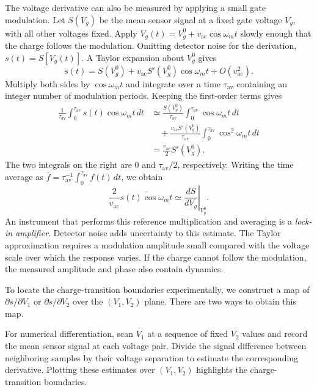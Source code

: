 The voltage derivative can also be measured by applying a small
gate modulation. Let $S(V_g)$ be the mean sensor signal at a fixed
gate voltage $V_g$, with all other voltages fixed. Apply
$V_g(t)=V_g^0+v_{\mathrm{ac}}\cos\omega_m t$ slowly enough that the
charge follows the modulation. Omitting detector noise for the
derivation, $s(t)=S[V_g(t)]$. A Taylor expansion about $V_g^0$ gives
\[
 s(t)=S(V_g^0)
       +v_{\mathrm{ac}}S'(V_g^0)\cos\omega_m t
       +O(v_{\mathrm{ac}}^2).
\]
Multiply both sides by $\cos\omega_m t$ and integrate over a time
$\tau_{\mathrm{av}}$ containing an integer number of modulation
periods. Keeping the first-order terms gives
\[
 \begin{aligned}
 \frac{1}{\tau_{\mathrm{av}}}
   \int_0^{\tau_{\mathrm{av}}}s(t)\cos\omega_m t\,dt
 &\simeq
 \frac{S(V_g^0)}{\tau_{\mathrm{av}}}
   \int_0^{\tau_{\mathrm{av}}}\cos\omega_m t\,dt
 \\
 &\quad+
 \frac{v_{\mathrm{ac}}S'(V_g^0)}{\tau_{\mathrm{av}}}
   \int_0^{\tau_{\mathrm{av}}}\cos^2\omega_m t\,dt
 \\
 &=\frac{v_{\mathrm{ac}}}{2}S'(V_g^0).
 \end{aligned}
\]
The two integrals on the right are $0$ and
$\tau_{\mathrm{av}}/2$, respectively. Writing the time average as
$\overline f=\tau_{\mathrm{av}}^{-1}
\int_0^{\tau_{\mathrm{av}}}f(t)\,dt$, we obtain
\begin{equation}
 \frac{2}{v_{\mathrm{ac}}}
    \overline{s(t)\cos\omega_m t}
       \simeq \left.\frac{dS}{dV_g}\right|_{V_g^0}.
 \label{eq:measurement-lock-in}
\end{equation}
An instrument that performs this reference multiplication and
averaging is a \emph{lock-in amplifier}. Detector noise adds
uncertainty to this estimate. The Taylor approximation requires a
modulation amplitude small compared with the voltage scale over
which the response varies. If the charge cannot follow the
modulation, the measured amplitude and phase also contain dynamics.

To locate the charge-transition boundaries experimentally, we
construct a map of $\partial\overline s/\partial V_1$ or
$\partial\overline s/\partial V_2$ over the $(V_1,V_2)$ plane.
There are two ways to obtain this map.

For numerical differentiation, scan $V_1$ at a sequence of fixed
$V_2$ values and record the mean sensor signal at each voltage
pair. Divide the signal difference between neighboring samples
by their voltage separation to estimate the corresponding
derivative. Plotting these estimates over $(V_1,V_2)$ highlights
the charge-transition boundaries.

